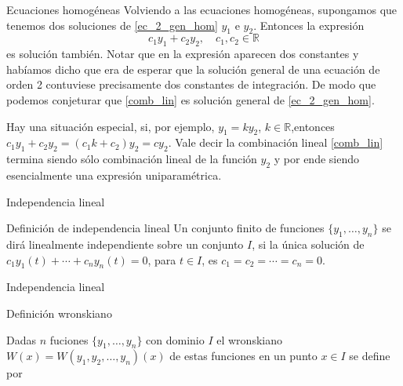 \documentclass[handout,hyperref={colorlinks=true}]{beamer}
\newcommand{\rr}{\mathbb{R}}
\newcommand{\nl}{\onslide<+-> }
\begin{document}
\begin{frame}{Ecuaciones homogéneas}
\nl Volviendo a las ecuaciones homogéneas, supongamos que tenemos dos soluciones de \eqref{ec_2_gen_hom} $y_1$ e $y_2$. Entonces la expresión 
\begin{equation}\label{comb_lin}
   c_1y_1+c_2y_2,\quad c_1,c_2\in\rr
\end{equation}
es solución también. \nl Notar que en la expresión aparecen dos constantes y habíamos dicho que era de esperar que la solución general de una ecuación de orden 2 contuviese
precisamente dos constantes de integración. De modo que podemos conjeturar que \eqref{comb_lin} es solución general de \eqref{ec_2_gen_hom}. 

\nl Hay una situación especial, si, por ejemplo, $y_1=ky_2$, $k\in\rr$,entonces $c_1y_1+c_2y_2=(c_1k+c_2)y_2=cy_2$. Vale decir la combinación lineal \eqref{comb_lin}
termina siendo sólo combinación lineal de la función $y_2$ y por ende siendo esencialmente una expresión uniparamétrica.  
\end{frame}

\begin{frame}{Independencia lineal}
 
\begin{block}{Definición de independencia lineal}
 Un conjunto finito de funciones $\{y_1,\ldots,y_n\}$ se dirá linealmente independiente sobre un conjunto $I$, 
 si la única solución de $c_1y_1(t)+\cdots+c_ny_n(t)=0$, para $t\in I$, es $c_1=c_2=\cdots=c_n=0$.
\end{block}

\end{frame}

\begin{frame}{Independencia lineal}
 
\begin{block}{Definición wronskiano}

Dadas $n$ fuciones  $\{y_1,\ldots,y_n\}$ con dominio $I$ el wronskiano $W(x)=W(y_1,y_2,\ldots,y_n)(x)$ de estas funciones en un punto $x\in I$ se define por
\end{block}
\end{frame}
\end{document}
